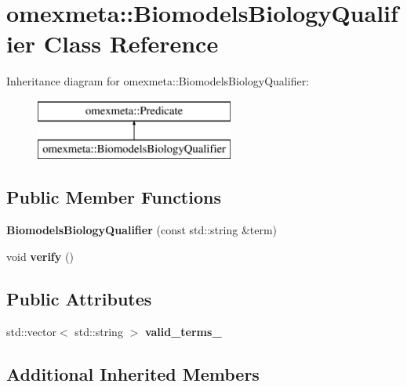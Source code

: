 \hypertarget{classomexmeta_1_1BiomodelsBiologyQualifier}{}\section{omexmeta\+:\+:Biomodels\+Biology\+Qualifier Class Reference}
\label{classomexmeta_1_1BiomodelsBiologyQualifier}
Inheritance diagram for omexmeta\+:\+:Biomodels\+Biology\+Qualifier\+:\begin{figure}[H]
\begin{center}
\leavevmode
\includegraphics[height=2.000000cm]{classomexmeta_1_1BiomodelsBiologyQualifier}
\end{center}
\end{figure}
\subsection*{Public Member Functions}
\begin{DoxyCompactItemize}
\item 
\mbox{\label{classomexmeta_1_1BiomodelsBiologyQualifier_a4dfa8fd975ceba60da6d3ccabdfb4514}} 
{\bfseries Biomodels\+Biology\+Qualifier} (const std\+::string \&term)
\item 
\mbox{\label{classomexmeta_1_1BiomodelsBiologyQualifier_ade9766c18afa895e7c745aa4679ccfce}} 
void {\bfseries verify} ()
\end{DoxyCompactItemize}
\subsection*{Public Attributes}
\begin{DoxyCompactItemize}
\item 
std\+::vector$<$ std\+::string $>$ {\bfseries valid\+\_\+terms\+\_\+}
\end{DoxyCompactItemize}
\subsection*{Additional Inherited Members}


